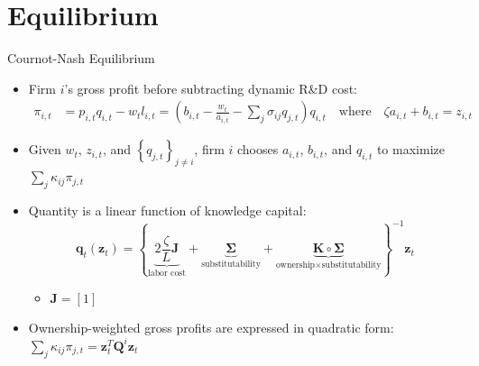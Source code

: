\documentclass[
  10pt, %
  aspectratio=169,  %
  handout
]{beamer}
\theoremstyle{plain}
\begin{document}
\section{Equilibrium}

\begin{frame}{Cournot-Nash Equilibrium}
  \begin{itemize}
    \item \label{cournot}Firm $i$'s gross profit before subtracting dynamic
          R\&D cost:
          \begin{align*}
            \pi_{i,t} & =p_{i,t}q_{i,t}-w_{t}l_{i,t}=\left(b_{i,t}-\frac{w_{t}}{a_{i,t}}-\sum_{j}\sigma_{ij}q_{j,t}\right)q_{i,t}\quad\text{where}\quad\zeta a_{i,t}+b_{i,t}=z_{i,t}
          \end{align*}
    \item Given $w_{t}$, $z_{i,t}$, and $\left\{ q_{j,t}\right\} _{j\neq i}$,
          firm $i$ chooses $a_{i,t}$, $b_{i,t}$, and $q_{i,t}$ to maximize
          $\sum_{j}\kappa_{ij}\pi_{j,t}$\pause\medskip{}
    \item Quantity is a linear function of knowledge capital:
          \[
            \boldsymbol{q}_{t}(\boldsymbol{z}_{t})=\left\{ \underbrace{2\frac{\zeta}{L}\boldsymbol{J}}_{\text{labor cost}}+\underbrace{\boldsymbol{\Sigma}}_{\text{substitutability}}+\underbrace{\boldsymbol{K}\circ\boldsymbol{\Sigma}}_{\text{ownership}\times\text{substitutability}}\right\} ^{-1}\boldsymbol{z}_{t}
          \]

          \begin{itemize}
            \item $\boldsymbol{J}=[1]$ \medskip{}
          \end{itemize}
    \item Ownership-weighted gross profits are expressed in quadratic form:
          $\sum_{j}\kappa_{ij}\pi_{j,t}=\boldsymbol{z}_{t}^{T}\boldsymbol{Q}^{i}\boldsymbol{z}_{t}$
          \hyperlink{Q}{}
  \end{itemize}
\end{frame}
%
\end{document}

